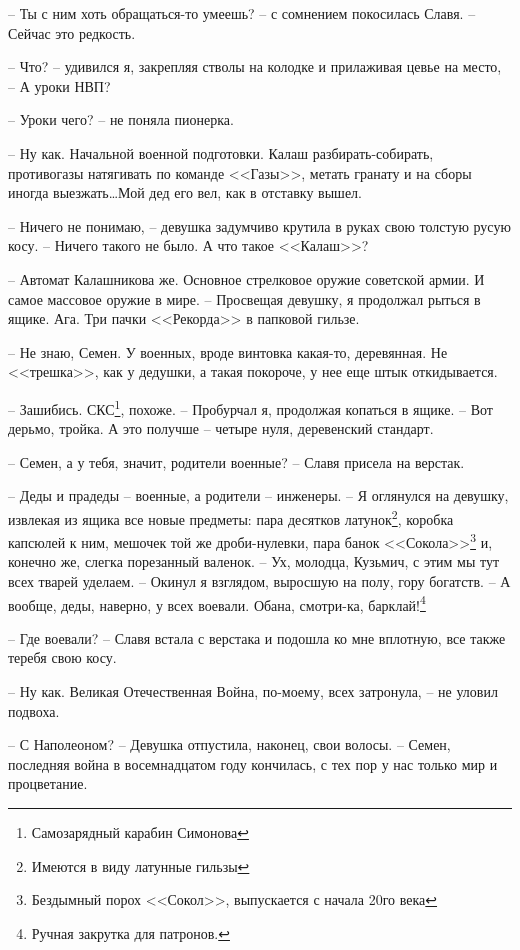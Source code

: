 \documentclass[a4paper]{book}
\begin{document}
-- Ты с ним хоть обращаться-то умеешь? -- с сомнением покосилась Славя. -- Сейчас это редкость.

-- Что? -- удивился я, закрепляя стволы на колодке и прилаживая цевье на место, -- А уроки НВП?

-- Уроки чего? -- не поняла пионерка.

-- Ну как. Начальной военной подготовки. Калаш разбирать-собирать, противогазы натягивать по команде <<Газы>>, метать гранату и на сборы иногда выезжать\ldots Мой дед его вел, как в отставку вышел.

-- Ничего не понимаю, -- девушка задумчиво крутила в руках свою толстую русую косу. -- Ничего такого не было. А что такое <<Калаш>>?

-- Автомат Калашникова же. Основное стрелковое оружие советской армии. И самое массовое оружие в мире. -- Просвещая девушку, я продолжал рыться в ящике. Ага. Три пачки <<Рекорда>> в папковой гильзе.

-- Не знаю, Семен. У военных, вроде винтовка какая-то, деревянная. Не <<трешка>>, как у дедушки, а такая покороче, у нее еще штык откидывается.

-- Зашибись. СКС\footnote{Самозарядный карабин Симонова}, похоже. -- Пробурчал я, продолжая копаться в ящике. --  Вот дерьмо, тройка. А это получше -- четыре нуля, деревенский стандарт. 

-- Семен, а у тебя, значит, родители военные? -- Славя присела на верстак. 

-- Деды и прадеды -- военные, а родители -- инженеры. -- Я оглянулся на девушку, извлекая из ящика все новые предметы: пара десятков латунок\footnote{Имеются в виду латунные гильзы}, коробка капсюлей к ним, мешочек той же дроби-нулевки, пара банок <<Сокола>>\footnote{Бездымный порох <<Сокол>>, выпускается с начала 20го века} и, конечно же, слегка порезанный валенок. -- Ух, молодца, Кузьмич, с этим мы тут всех тварей уделаем. -- Окинул я взглядом, выросшую на полу, гору богатств. -- А вообще, деды, наверно, у всех воевали. Обана, смотри-ка, барклай!\footnote{Ручная закрутка для патронов.}

-- Где воевали? -- Славя встала с верстака и подошла ко мне вплотную, все также теребя свою косу. 

-- Ну как. Великая Отечественная Война, по-моему, всех затронула, -- не уловил  подвоха. 

-- С Наполеоном? -- Девушка отпустила, наконец, свои волосы. -- Семен, последняя война в восемнадцатом году кончилась, с тех пор у нас только мир и процветание. 
\end{document}
